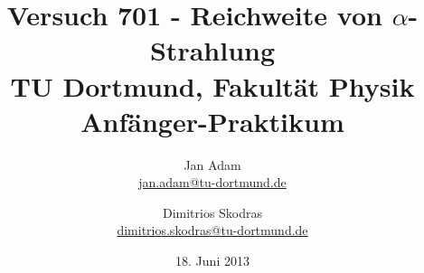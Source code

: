 

\usepackage[version=3]{mhchem}


\title{Versuch 701 - Reichweite von $\alpha$-Strahlung\\				%
\large TU Dortmund, Fakultät Physik\\ 
\normalsize Anfänger-Praktikum}

\author{Jan Adam\\			%
{\small \href{jan.adam@tu-dortmund.de}{jan.adam@tu-dortmund.de}}	%
\and						%
Dimitrios Skodras\\					%
{\small \href{dimitrios.skodras@tu-dortmund.de}{dimitrios.skodras@tu-dortmund.de}}		%
}
\date{18. Juni 2013}				%





\maketitle					%
\thispagestyle{empty} 				%



\tableofcontents


\newpage					%


